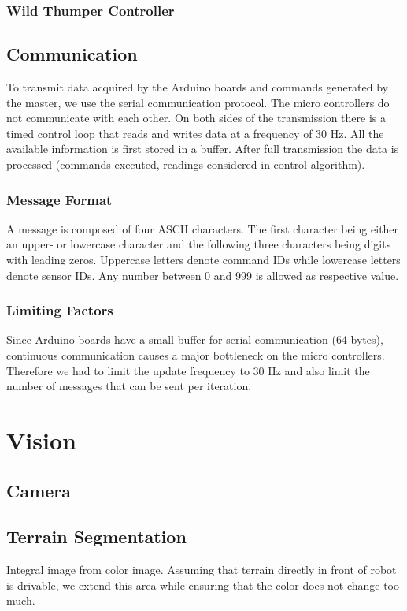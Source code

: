 \subsubsection{Wild Thumper Controller}

\subsection{Communication}
To transmit data acquired by the Arduino boards and commands generated by the master,
we use the serial communication protocol. The micro controllers do not communicate with
each other. On both sides of the transmission there is a timed control loop that reads
and writes data at a frequency of 30 Hz. All the available information is first 
stored in a buffer. After full transmission the data is processed (commands executed, 
readings considered in control algorithm).

\subsubsection{Message Format}
A message is composed of four ASCII characters. The first character being either an
upper- or lowercase character and the following three characters being digits with
leading zeros. Uppercase letters denote command IDs while lowercase letters denote
sensor IDs. Any number between 0 and 999 is allowed as respective value. 

\subsubsection{Limiting Factors}
Since Arduino boards have a small buffer for serial communication (64 bytes), continuous
communication causes a major bottleneck on the micro controllers. Therefore we 
had to limit the update frequency to 30 Hz and also limit the number of messages
that can be sent per iteration.

\section{Vision}

\subsection{Camera}

\subsection{Terrain Segmentation}
Integral image from color image. Assuming that terrain directly in front of robot is 
drivable, we extend this area while ensuring that the color does not change too much.

